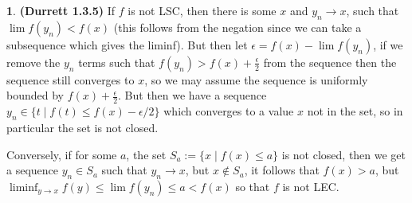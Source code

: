 \documentclass[10.5pt]{article}
\theoremstyle{definition}
\newtheorem{pb}{}
\newcommand{\set}[1]{\{#1\}}
\begin{document}
    \begin{pb}\textbf{(Durrett 1.3.5)}
        If \(f\) is not LSC, then there is some \(x\) and \(y_n \to x\), such that \(\lim f(y_n) < f(x)\) (this follows from the negation since we can take a subsequence which gives the liminf). But then let \(\epsilon = f(x) - \lim f(y_n)\), if we remove the \(y_n\) terms such that \(f(y_n) > f(x) + \frac{\epsilon}{2}\) from the sequence then the sequence still converges to \(x\), so we may assume the sequence is uniformly bounded by \(f(x) + \frac{\epsilon}{2}\). But then we have a sequence \(y_n \in \set{t \mid f(t) \leq f(x) - \epsilon/2}\) which converges to a value \(x\) not in the set, so in particular the set is not closed.

        Conversely, if for some \(a\), the set \(S_a := \set{x \mid f(x) \leq a}\) is not closed, then we get a sequence \(y_n \in S_a\) such that \(y_n \to x\), but \(x \not \in S_a\), it follows that \(f(x) > a\), but \(\liminf_{y\to x}f(y) \leq \lim f(y_n) \leq a < f(x)\) so that \(f\) is not LEC.
    \end{pb}
\end{document}
